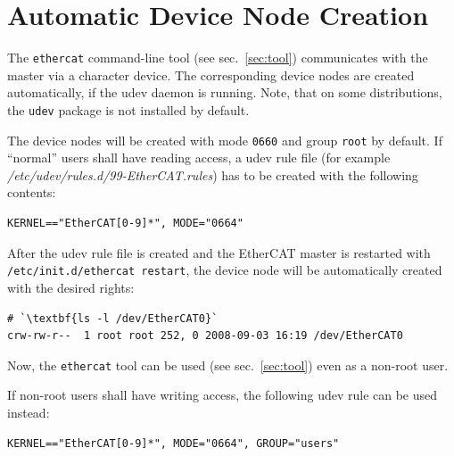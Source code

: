 \documentclass[a4paper,12pt,BCOR6mm,bibtotoc,idxtotoc]{scrbook}
\begin{document}
\section{Automatic Device Node Creation}
\label{sec:autonode}

The \lstinline+ethercat+ command-line tool (see sec.~\ref{sec:tool})
communicates with the master via a character device. The corresponding device
nodes are created automatically, if the udev daemon is running.  Note, that on
some distributions, the \lstinline+udev+ package is not installed by default.

The device nodes will be created with mode \lstinline+0660+ and group
\lstinline+root+ by default. If ``normal'' users shall have reading access, a
udev rule file (for example \textit{/etc/udev/rules.d/99-EtherCAT.rules}) has
to be created with the following contents:

\begin{lstlisting}
KERNEL=="EtherCAT[0-9]*", MODE="0664"
\end{lstlisting}

After the udev rule file is created and the EtherCAT master is restarted with
\lstinline[breaklines=true]+/etc/init.d/ethercat restart+, the device node
will be automatically created with the desired rights:

\begin{lstlisting}
# `\textbf{ls -l /dev/EtherCAT0}`
crw-rw-r--  1 root root 252, 0 2008-09-03 16:19 /dev/EtherCAT0
\end{lstlisting}

Now, the \lstinline+ethercat+ tool can be used (see sec.~\ref{sec:tool}) even
as a non-root user.

If non-root users shall have writing access, the following udev rule can be
used instead:

\begin{lstlisting}
KERNEL=="EtherCAT[0-9]*", MODE="0664", GROUP="users"
\end{lstlisting}

\end{document}
